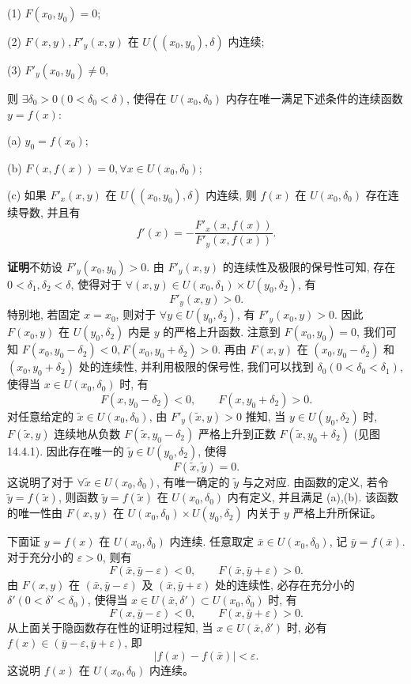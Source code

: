 \documentclass[UTF8,12pt,a4paper,fontset=fandol]{ctexart}
\begin{document}
(1) $F(x_0,y_0)=0$;

(2) $F(x,y),F'_y(x,y)$ 在 $U((x_0,y_0),\delta)$ 内连续;

(3) $F'_y(x_0,y_0)\ne0$,

则 $\exists\delta_0>0(0<\delta_0<\delta)$, 使得在 $U(x_0,\delta_0)$ 内存在唯一满足下述条件的连续函数 $y=f(x)$:

(a) $y_0=f(x_0)$;

(b) $F(x,f(x))=0,\forall x\in U(x_0,\delta_0)$;

(c) 如果 $F'_x(x,y)$ 在 $U((x_0,y_0),\delta)$ 内连续, 则 $f(x)$ 在 $U(x_0,\delta_0)$ 存在连续导数, 并且有
\[
  f'(x)=-\frac{F'_x(x,f(x))}{F'_y(x,f(x))}.
\]

\noindent\textbf{证明}\quad 不妨设 $F'_y(x_0,y_0)>0$. 由 $F'_y(x,y)$ 的连续性及极限的保号性可知, 存在 $0<\delta_1,\delta_2<\delta$, 使得对于 $\forall(x,y)\in U(x_0,\delta_1)\times U(y_0,\delta_2)$, 有
\[
  F'_y(x,y)>0.
\]
特别地, 若固定 $x=x_0$, 则对于 $\forall y\in U(y_0,\delta_2)$, 有 $F'_y(x_0,y)>0$. 因此 $F(x_0,y)$ 在 $U(y_0,\delta_2)$ 内是 $y$ 的严格上升函数. 注意到 $F(x_0,y_0)=0$, 我们可知 $F(x_0,y_0-\delta_2)<0,F(x_0,y_0+\delta_2)>0$. 再由 $F(x,y)$ 在 $(x_0,y_0-\delta_2)$ 和 $(x_0,y_0+\delta_2)$ 处的连续性, 并利用极限的保号性, 我们可以找到 $\delta_0(0<\delta_0<\delta_1)$, 使得当 $x\in U(x_0,\delta_0)$ 时, 有
\[
  F(x,y_0-\delta_2)<0,\qquad F(x,y_0+\delta_2)>0.
\]
对任意给定的 $\tilde x\in U(x_0,\delta_0)$, 由 $F'_y(\tilde x,y)>0$ 推知, 当 $y\in U(y_0,\delta_2)$ 时, $F(\tilde x,y)$ 连续地从负数 $F(\tilde x,y_0-\delta_2)$ 严格上升到正数 $F(\tilde x,y_0+\delta_2)$ (见图 14.4.1). 因此存在唯一的 $\tilde y\in U(y_0,\delta_2)$, 使得
\[
  F(\tilde x,\tilde y)=0.
\]
这说明了对于 $\forall\tilde x\in U(x_0,\delta_0)$, 有唯一确定的 $\tilde y$ 与之对应. 由函数的定义, 若令 $\tilde y=f(\tilde x)$, 则函数 $\tilde y=f(\tilde x)$ 在 $U(x_0,\delta_0)$ 内有定义, 并且满足 (a),(b). 该函数的唯一性由 $F(x,y)$ 在 $U(x_0,\delta_0)\times U(y_0,\delta_2)$ 内关于 $y$ 严格上升所保证。

下面证 $y=f(x)$ 在 $U(x_0,\delta_0)$ 内连续. 任意取定 $\bar x\in U(x_0,\delta_0)$, 记 $\bar y=f(\bar x)$. 对于充分小的 $\varepsilon>0$, 则有
\[
  F(\bar x,\bar y-\varepsilon)<0,\qquad F(\bar x,\bar y+\varepsilon)>0.
\]
由 $F(x,y)$ 在 $(\bar x,\bar y-\varepsilon)$ 及 $(\bar x,\bar y+\varepsilon)$ 处的连续性, 必存在充分小的 $\delta'(0<\delta'<\delta_0)$, 使得当 $x\in U(\bar x,\delta')\subset U(x_0,\delta_0)$ 时, 有
\[
  F(x,\bar y-\varepsilon)<0,\qquad F(x,\bar y+\varepsilon)>0.
\]
从上面关于隐函数存在性的证明过程知, 当 $x\in U(\bar x,\delta')$ 时, 必有 $f(x)\in(\bar y-\varepsilon,\bar y+\varepsilon)$, 即
\[
  |f(x)-f(\bar x)|<\varepsilon.
\]
这说明 $f(x)$ 在 $U(x_0,\delta_0)$ 内连续。
\end{document}
